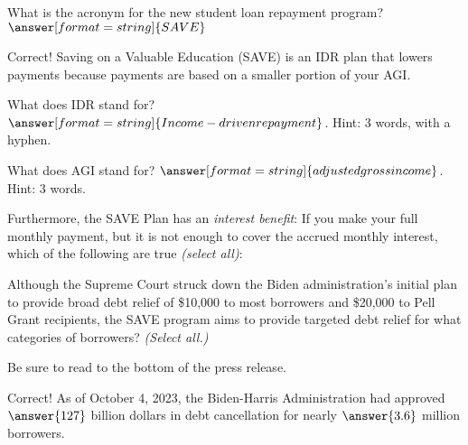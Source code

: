 \documentclass[handout,space,nooutcomes]{ximera}
\begin{document}
\begin{question}
What is the acronym for the new student loan repayment program?  $\answer[format=string]{SAVE}$
\begin{question}
Correct!  Saving on a Valuable Education (SAVE) is an IDR plan that lowers payments because payments are based on a smaller portion of your AGI.  

What does IDR stand for?  $\answer[format=string]{Income-driven repayment}$.  Hint: 3 words, with a hyphen. 

What does AGI stand for?  $\answer[format=string]{adjusted gross income}$. Hint: 3 words. 

Furthermore, the SAVE Plan has an \emph{interest benefit}: If you make your full monthly payment, but it is not enough to cover the accrued monthly interest, which of the following are true \emph{(select all)}: 
\begin{selectAll}
\end{selectAll}
\end{question}

\begin{question}
Although the Supreme Court struck down the Biden administration's initial plan to provide broad debt relief of \$10,000 to most borrowers and \$20,000 to Pell Grant recipients, the SAVE program aims to provide targeted debt relief for what categories of borrowers?  \emph{(Select all.)}
\begin{selectAll}
\end{selectAll}
\begin{feedback}[incorrect]
Be sure to read to the bottom of the press release.
\end{feedback}
\begin{question}
Correct!  As of October 4, 2023, the Biden-Harris Administration had approved $\answer{127}$ billion dollars in debt cancellation for nearly $\answer{3.6}$ million borrowers.  
\end{question}
\end{question}
\end{question}
\end{document}
